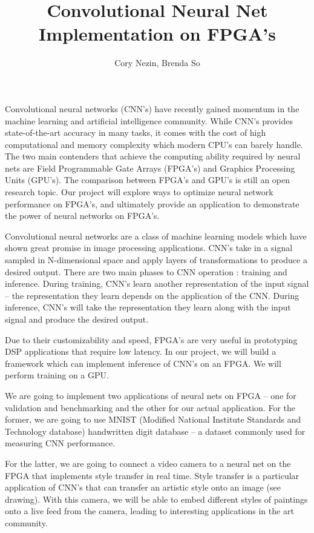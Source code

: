 \documentclass[10pt]{article}
\begin{document}
\title{Convolutional Neural Net Implementation on FPGA's}
\author{Cory Nezin, Brenda So}
\maketitle
Convolutional neural networks (CNN's) have recently gained momentum in the machine learning and artificial intelligence community. While CNN's provides state-of-the-art accuracy in many tasks, it comes with the cost of high computational and memory complexity which modern CPU’s can barely handle. The two main contenders that achieve the computing ability required by neural nets are Field Programmable Gate Arrays (FPGA's) and Graphics Processing Units (GPU’s). The comparison between FPGA’s and GPU’s is still an open research topic. Our project will explore ways to optimize neural network performance on FPGA's, and ultimately provide an application to demonstrate the power of neural networks on FPGA's.

Convolutional neural networks are a class of machine learning models which have shown great promise in image processing applications. CNN's take in a signal sampled in N-dimensional space and apply layers of transformations to produce a desired output. There are two main phases to CNN operation : training and inference. During training, CNN's learn another representation of the input signal -- the representation they learn depends on the application of the CNN. During inference, CNN's will take the representation they learn along with the input signal and produce the desired output. 

Due to their customizability and speed, FPGA's are very useful in prototyping DSP applications that require low latency. In our project, we will build a framework which can implement inference of CNN's on an FPGA. We will perform training on a GPU. 

We are going to implement two applications of neural nets on FPGA -- one for validation and benchmarking and the other for our actual application. For the former, we are going to use MNIST (Modified National Institute Standards and Technology database) handwritten digit database -- a dataset commonly used for measuring CNN performance. 

For the latter, we are going to connect a video camera to a neural net on the FPGA that implements style transfer in real time. Style transfer is a particular application of CNN's that can transfer an artistic style onto an image (see drawing). With this camera, we will be able to embed different styles of paintings onto a live feed from the camera, leading to interesting applications in the art community. 
\end{document}

